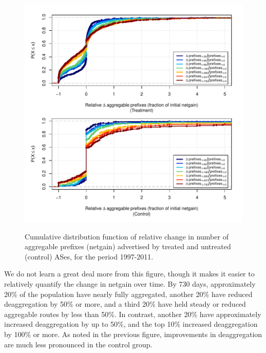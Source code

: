 \begin{figure}[h!]
\begin{centering}
\begin{singlespace}
\includegraphics[width=6in]{figures/behavior-rel_netgain-1997_2011-corr.pdf}
    \vspace{-2em}\\
    \caption{Cumulative distribution function of relative change in number of
    aggregable prefixes (netgain) advertised by treated and untreated (control)
    ASes, for the period 1997-2011.}
    \label{fig:delta_rel_netgain_cdf}
\end{singlespace}
\end{centering}
\end{figure}

We do not learn a great deal more from this figure, though it makes it easier
to relatively quantify the change in netgain over time. By 730 days,
approximately 20\% of the population have nearly fully aggregated, another 20\%
have reduced deaggregation by 50\% or more, and a third 20\% have held steady
or reduced aggregable routes by less than 50\%. In contrast, another 20\% have
approximately increased deaggregation by up to 50\%, and the top 10\% increased
deaggregation by 100\% or more. As noted in the previous figure, improvements
in deaggregation are much less pronounced in the control group.

